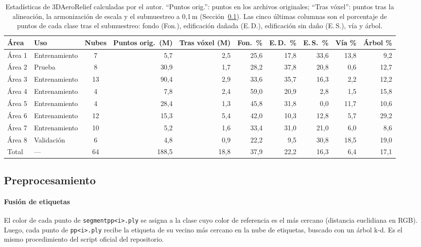 \documentclass[5p]{elsarticle}
\begin{document}
\begin{table}[t]
\centering
\caption{Estadísticas de 3DAeroRelief calculadas por el autor. ``Puntos orig.'': puntos en los archivos originales; ``Tras vóxel'': puntos tras la alineación, la armonización de escala y el submuestreo a 0,1\,m (Sección~\ref{sec:prepro}). Las cinco últimas columnas son el porcentaje de puntos de cada clase tras el submuestreo: fondo (Fon.), edificación dañada (E.\,D.), edificación sin daño (E.\,S.), vía y árbol.}\label{tab:stats}
\footnotesize
\setlength{\tabcolsep}{4pt}
\begin{tabular}{@{}llcrrrrrrr@{}}
\toprule
Área & Uso & Nubes & \multicolumn{1}{c}{Puntos orig.\ (M)} & \multicolumn{1}{c}{Tras vóxel (M)} & Fon.\ \% & E.\,D.\ \% & E.\,S.\ \% & Vía \% & Árbol \% \\
\midrule
Área 1 & Entrenamiento & 7 & 5,7 & 2,5 & 25,6 & 17,8 & 33,6 & 13,8 & 9,2 \\
Área 2 & Prueba & 8 & 30,9 & 1,7 & 28,2 & 37,8 & 20,8 & 0,6 & 12,7 \\
Área 3 & Entrenamiento & 13 & 90,4 & 2,9 & 33,6 & 35,7 & 16,3 & 2,2 & 12,2 \\
Área 4 & Entrenamiento & 4 & 7,8 & 2,4 & 59,0 & 20,9 & 2,8 & 1,5 & 15,8 \\
Área 5 & Entrenamiento & 4 & 28,4 & 1,3 & 45,8 & 31,8 & 0,0 & 11,7 & 10,6 \\
Área 6 & Entrenamiento & 12 & 15,3 & 5,4 & 42,0 & 10,3 & 12,8 & 5,7 & 29,2 \\
Área 7 & Entrenamiento & 10 & 5,2 & 1,6 & 33,4 & 31,0 & 21,0 & 6,0 & 8,6 \\
Área 8 & Validación & 6 & 4,8 & 0,9 & 22,2 & 9,5 & 30,8 & 18,5 & 19,0 \\
\midrule
Total & --- & 64 & 188,5 & 18,8 & 37,9 & 22,2 & 16,3 & 6,4 & 17,1 \\
\bottomrule
\end{tabular}
\end{table}

\subsection{Preprocesamiento}\label{sec:prepro}

\paragraph{Fusión de etiquetas} El color de cada punto de \texttt{segmentpp<i>.ply} se asigna a la clase cuyo color de referencia es el más cercano (distancia euclidiana en RGB). Luego, cada punto de \texttt{pp<i>.ply} recibe la etiqueta de su vecino más cercano en la nube de etiquetas, buscado con un árbol k-d. Es el mismo procedimiento del script oficial del repositorio.
\end{document}
